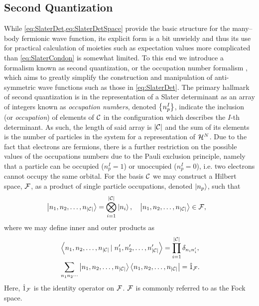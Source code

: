 \subsection{Second Quantization}
\label{sec:SQ}

While \cref{eq:SlaterDet,eq:SlaterDetSpace} provide the basic structure for the many--body fermionic wave function, its explicit form
is a bit unwieldy and thus its use for practical calculation of moieties such as expectation values more complicated than \cref{eq:SlaterCondon} 
is somewhat limited.
To this end we introduce a formalism known as second quantization, or the occupation number formalism \cite{Walecka12_book,Schuck04_book,Ostlund12_book},
which aims to greatly simplify the construction and manipulation of anti-symmetric wave functions such as those in 
\cref{eq:SlaterDet}. The primary hallmark of second quantization is in the representation of a Slater determinant
as an array of integers known as \emph{occupation numbers}, denoted $\left \lbrace n_p^I \right\rbrace$, indicate the inclusion (or \emph{occupation}) of elements
of $\mathcal{C}$ in the configuration which describes the $I$-th determinant. As such, the length of said array is $\vert \mathcal{C} \vert$
and the sum of its elements is the number of particles in the system for a representation of $\mathcal{H}^N$. Due to the fact that electrons are fermions,
there is a further restriction on the possible values of the occupations numbers due to the Pauli exclusion principle,
namely that a particle can be occupied ($n^I_p=1$) or unoccupied ($n^I_p=0$), i.e. two electrons cannot occupy the same orbital. 
For the basis $\mathcal{C}$ we may construct a Hilbert space, $\mathcal{F}$, as a product of single particle occupations, denoted $\left\vert n_p \right\rangle$, such that \cite{Walecka12_book}
\begin{align}
&\left\vert n_1,n_2,\ldots,n_{\vert\mathcal{C}\vert} \right\rangle = \bigotimes_{i=1}^{\vert \mathcal{C} \vert} \left\vert n_i \right\rangle, 
  \quad \left\vert n_1,n_2,\ldots,n_{\vert\mathcal{C}\vert} \right\rangle \in \mathcal{F},
\end{align}
where we may define inner and outer products as
\begin{subequations}
  \label{eq:OccOrthoComp}
\begin{align}
&\left\langle n_1,n_2,\ldots,n_{\vert\mathcal{C}\vert} \left\vert\right. n'_1,n'_2,\ldots,n'_{\vert\mathcal{C}\vert} \right\rangle = \prod_{i = 1}^{\vert\mathcal{C}\vert} \delta_{n_i n_i'},\\
&\sum_{n_1n_2\cdots} \left\vert n_1,n_2,\ldots,n_{\vert\mathcal{C}\vert} \right\rangle\left\langle n_1,n_2,\ldots,n_{\vert\mathcal{C}\vert} \right\vert = \hat{1}_{\mathcal{F}}.
\end{align}
\end{subequations}
Here, $\hat{1}_{\mathcal{F}}$ is the identity operator on $\mathcal{F}$. $\mathcal{F}$ is commonly referred to as the Fock space.

